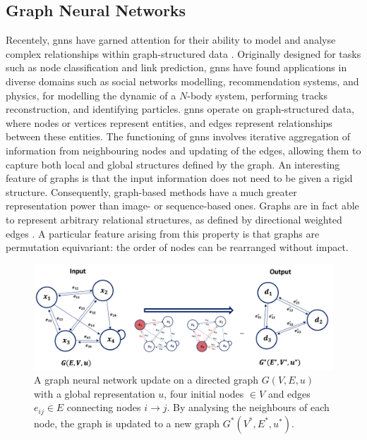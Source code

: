 \subsection{Graph Neural Networks}\label{chapter-GNN}
Recentely, \glspl{gnn} have garned attention for their ability to model and analyse complex relationships within graph-structured data \cite{graphNetRef}. Originally designed for tasks such as node classification and link prediction, \glspl{gnn} have found applications in diverse domains such as social networks modelling, recommendation systems, and physics, for modelling the dynamic of a $N$-body system, performing tracks reconstruction, and identifying particles. \glspl{gnn} operate on graph-structured data, where nodes or vertices represent entities, and edges represent relationships between these entities. The functioning of \glspl{gnn} involves iterative aggregation of information from neighbouring nodes and updating of the edges, allowing them to capture both local and global structures defined by the graph. An interesting feature of graphs is that the input information does not need to be given a rigid structure. Consequently, graph-based methods have a much greater representation power than image- or sequence-based ones. Graphs are in fact able to represent arbitrary relational structures, as defined by directional weighted edges \cite{graphInductiveBias}. A particular feature arising from this property is that graphs are permutation equivariant: the order of nodes can be rearranged without impact. \\

\begin{figure}[h!]
    \center
    \includegraphics[width=\textwidth]{Images/ML/gnn.png}
    \caption{A graph neural network update on a directed graph $G(V, E, u)$ with a global representation $u$, four initial nodes $\in V$ and edges $e_{ij} \in E$ connecting nodes $i \rightarrow j$. By analysing the neighbours of each node, the graph is updated to a new graph $G^*(V^*, E^*, u^*)$.} %
    \label{fig:gnnScheme}
\end{figure}

